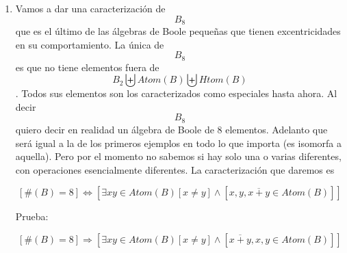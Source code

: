 \documentclass[
]{article}
\begin{document}
\begin{enumerate}
\begin{enumerate}
\begin{enumerate}
\begin{enumerate}
        Entonces:

        \begin{enumerate}
        \def\labelenumv{\arabic{enumv}.}
        \item
          \[\mathit{Htom}{{(B)} \supseteq {\{{\overline{x},\overline{y}}\}}}\]
        \item
          \[{x + y} \neq 1\]
        \item
          Ponemos sin pérdida de generalidad

          \[{x + y} = \overline{x}\]
        \item
          \[{{{{0 = {x + \overline{x}}} = {x + {({x + y})}}} = {{({x + x})} + y}} = {x + y}} = \overline{x}\]
        \item
          \[1 = x\]
        \item
          \[{6 = \#}{B = 2}\mathit{ABSURDO}\]
        \end{enumerate}
      \item
        \[\forall{{\{{x,y}\}} \in \wp}{(B)}{{\{{x,y}\}} \nsubseteq B}\mathit{ABSURDO}\]
      \end{enumerate}
    \item
      Vamos a dar una caracterización de \[B_{8}\] que es el último de
      las álgebras de Boole pequeñas que tienen excentricidades en su
      comportamiento. La única de \[B_{8}\] es que no tiene elementos
      fuera de
      \[B_{2}\biguplus{\mathit{Atom}{(B)}}\biguplus{\mathit{Htom}{(B)}}\].
      Todos sus elementos son los caracterizados como especiales hasta
      ahora. Al decir \[B_{8}\] quiero decir en realidad un álgebra de
      Boole de 8 elementos. Adelanto que será igual a la de los primeros
      ejemplos en todo lo que importa (es isomorfa a aquella). Pero por
      el momento no sabemos si hay solo una o varias diferentes, con
      operaciones esencialmente diferentes. La caracterización que
      daremos es

      \[\left\lbrack {\#{{(B)} = 8}} \right\rbrack\Leftrightarrow\left\lbrack {\exists{\mathit{xy} \in \mathit{Atom}}{(B)}{\left\lbrack {x \neq y} \right\rbrack \land \left\lbrack {x,y,{\overline{x+y} \in \mathit{Atom}}{(B)}} \right\rbrack}} \right\rbrack\]

      Prueba:

      \[\left\lbrack {\#{{(B)} = 8}} \right\rbrack\Rightarrow\left\lbrack {\exists{\mathit{xy} \in \mathit{Atom}}{(B)}{\left\lbrack {x \neq y} \right\rbrack \land \left\lbrack {\overline{x+y},x,{y \in \mathit{Atom}}{(B)}} \right\rbrack}} \right\rbrack\]


\end{enumerate}
\end{enumerate}
\end{enumerate}
\end{document}
